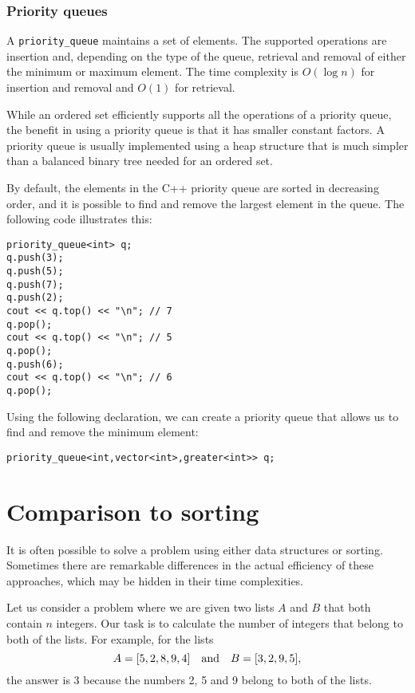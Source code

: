 \subsubsection{Priority queues}


A \texttt{priority\_queue}
maintains a set of elements.
The supported operations are insertion and,
depending on the type of the queue,
retrieval and removal of
either the minimum or maximum element.
The time complexity is $O(\log n)$
for insertion and removal and $O(1)$ for retrieval.

While an ordered set efficiently supports
all the operations of a priority queue,
the benefit in using a priority queue is
that it has smaller constant factors.
A priority queue is usually implemented using
a heap structure that is much simpler than a
balanced binary tree needed for an ordered set.

\begin{samepage}
By default, the elements in the C++
priority queue are sorted in decreasing order,
and it is possible to find and remove the
largest element in the queue.
The following code illustrates this:

\begin{lstlisting}
priority_queue<int> q;
q.push(3);
q.push(5);
q.push(7);
q.push(2);
cout << q.top() << "\n"; // 7
q.pop();
cout << q.top() << "\n"; // 5
q.pop();
q.push(6);
cout << q.top() << "\n"; // 6
q.pop();
\end{lstlisting}
\end{samepage}

Using the following declaration,
we can create a priority queue
that allows us to find and remove
the minimum element:

\begin{lstlisting}
priority_queue<int,vector<int>,greater<int>> q;
\end{lstlisting}

\section{Comparison to sorting}

It is often possible to solve a problem
using either data structures or sorting.
Sometimes there are remarkable differences
in the actual efficiency of these approaches,
which may be hidden in their time complexities.

Let us consider a problem where
we are given two lists $A$ and $B$
that both contain $n$ integers.
Our task is to calculate the number of integers
that belong to both of the lists.
For example, for the lists
\[A = [5,2,8,9,4] \hspace{10px} \textrm{and} \hspace{10px} B = [3,2,9,5],\]
the answer is 3 because the numbers 2, 5
and 9 belong to both of the lists.

